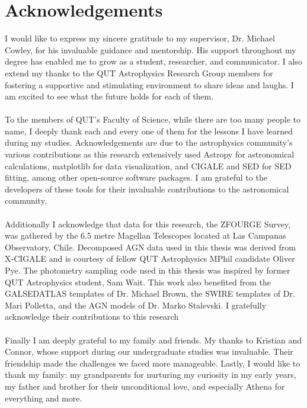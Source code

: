 \chapter*{Acknowledgements}
\thispagestyle{empty}
I would like to express my sincere gratitude to my supervisor, Dr. Michael Cowley, for his invaluable guidance and mentorship. His support throughout my degree has enabled me to grow as a student, researcher, and communicator. I also extend my thanks to the QUT Astrophysics Research Group members for fostering a supportive and stimulating environment to share ideas and laughs. I am excited to see what the future holds for each of them.\\\\ To the members of QUT's Faculty of Science, while there are too many people to name, I deeply thank each and every one of them for the lessons I have learned during my studies. Acknowledgements are due to the astrophysics community's various contributions as this research extensively used Astropy for astronomical calculations, matplotlib for data visualization, and CIGALE and SED for SED fitting, among other open-source software packages. I am grateful to the developers of these tools for their invaluable contributions to the astronomical community.\\\\ Additionally I acknowledge that data for this research, the ZFOURGE Survey, was gathered by the 6.5 metre Magellan Telescopes located at Las Campanas Observatory, Chile. Decomposed AGN data used in this thesis was derived from X-CIGALE and is courtesy of fellow QUT Astrophysics MPhil candidate Oliver Pye. The photometry sampling code used in this thesis was inspired by former QUT Astrophysics student, Sam Wait. This work also benefited from the GALSEDATLAS templates of Dr. Michael Brown, the SWIRE templates of Dr. Mari Polletta, and the AGN models of Dr. Marko Stalevski. I gratefully acknowledge their contributions to this research\\\\Finally I am deeply grateful to my family and friends. My thanks to Kristian and Connor, whose support during our undergraduate studies was invaluable. Their friendship made the challenges we faced more manageable. Lastly, I would like to thank my family: my grandparents for nurturing my curiosity in my early years, my father and brother for their unconditional love, and especially Athena for everything and more.
